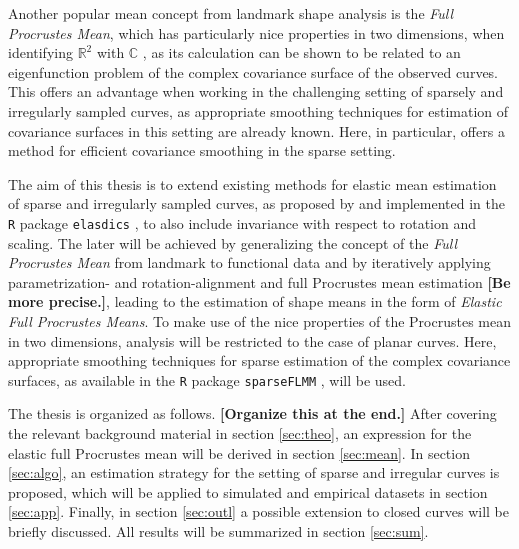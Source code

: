 Another popular mean concept from landmark shape analysis is the \textit{Full Procrustes Mean}, which has particularly nice properties in two dimensions, when identifying $\mathbb{R}^2$ with $\mathbb{C}$ \parencite[see][Chap.\ 8]{DrydenMardia2016}, as its calculation can be shown to be related to an eigenfunction problem of the complex covariance surface of the observed curves.
This offers an advantage when working in the challenging setting of sparsely and irregularly sampled curves, as appropriate smoothing techniques for estimation of covariance surfaces in this setting are already known.
Here, in particular, \cite{CederbaumScheiplGreven2018} offers a method for efficient covariance smoothing in the sparse setting. 

The aim of this thesis is to extend existing methods for elastic mean estimation of sparse and irregularly sampled curves, as proposed by \cite{Steyer2021} and implemented in the \texttt{R} package \texttt{elasdics} \parencite{elasdics}, to also include invariance with respect to rotation and scaling.
The later will be achieved by generalizing the concept of the \textit{Full Procrustes Mean} from landmark to functional data and by iteratively applying parametrization- and rotation-alignment and full Procrustes mean estimation \textbf{[Be more precise.]}, leading to the estimation of shape means in the form of \textit{Elastic Full Procrustes Means}.
To make use of the nice properties of the Procrustes mean in two dimensions, analysis will be restricted to the case of planar curves.
Here, appropriate smoothing techniques for sparse estimation of the complex covariance surfaces, as available in the \texttt{R} package \texttt{sparseFLMM} \parencite{sparseFLMM}, will be used.

The thesis is organized as follows. 
\textbf{[Organize this at the end.]}
After covering the relevant background material  in section \ref{sec:theo}, an expression for the elastic full Procrustes mean will be derived in section \ref{sec:mean}.
In section \ref{sec:algo}, an estimation strategy for the setting of sparse and irregular curves is proposed, which will be applied to simulated and empirical datasets in section \ref{sec:app}.
Finally, in section \ref{sec:outl} a possible extension to closed curves will be briefly discussed.
All results will be summarized in section \ref{sec:sum}.

\newpage
